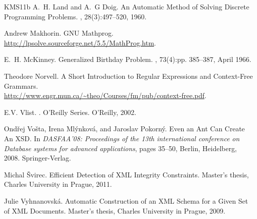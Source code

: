 \begin{thebibliography}{KMS{\etalchar{+}}11b}
A.~H. Land and A.~G Doig.
\newblock An Automatic Method of Solving Discrete Programming Problems.
, 28(3):497--520, 1960.

Andrew Makhorin.
\newblock GNU Mathprog.
\newblock \url{http://lpsolve.sourceforge.net/5.5/MathProg.htm}.

E.~H. McKinney.
\newblock Generalized Birthday Problem.
, 73(4):pp. 385--387, April
  1966.

Theodore Norvell.
\newblock A Short Introduction to Regular Expressions and Context-Free Grammars.\\
\newblock \url{http://www.engr.mun.ca/~theo/Courses/fm/pub/context-free.pdf}.

E.V. Vlist.
.
\newblock O'Reilly Series. O'Reilly, 2002.

Ond\v{r}ej Vo\v{s}ta, Irena Ml\'{y}nkov\'{a}, and Jaroslav Pokorn\'{y}.
\newblock Even an Ant Can Create An XSD.
\newblock In {\em DASFAA'08: Proceedings of the 13th international conference on Database systems for advanced applications}, pages 35--50, Berlin, Heidelberg, 2008. Springer-Verlag.

Michal \v{S}virec.
\newblock Efficient Detection of XML Integrity Constraints.
\newblock Master's thesis, Charles University in Prague, 2011.

Julie Vyhnanovsk\'{a}.
\newblock Automatic Construction of an XML Schema for a Given Set of XML Documents.
\newblock Master's thesis, Charles University in Prague, 2009.

\end{thebibliography}